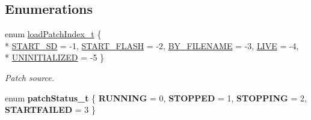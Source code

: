 \subsection*{Enumerations}
\begin{DoxyCompactItemize}
\item 
enum \hyperlink{group__PATCH_ga3bcfa0e2fd6136eb75131fe31d3c0ecf}{load\+Patch\+Index\+\_\+t} \{ \\*
\hyperlink{group__PATCH_gga3bcfa0e2fd6136eb75131fe31d3c0ecfa4ea978b80c692bb277f7219bc4941cac}{S\+T\+A\+R\+T\+\_\+\+SD} = -\/1, 
\hyperlink{group__PATCH_gga3bcfa0e2fd6136eb75131fe31d3c0ecfa14501ea9e7b84bf1917c39939a4fe295}{S\+T\+A\+R\+T\+\_\+\+F\+L\+A\+SH} = -\/2, 
\hyperlink{group__PATCH_gga3bcfa0e2fd6136eb75131fe31d3c0ecfabf80358ff9809b38be4b95d6d157914d}{B\+Y\+\_\+\+F\+I\+L\+E\+N\+A\+ME} = -\/3, 
\hyperlink{group__PATCH_gga3bcfa0e2fd6136eb75131fe31d3c0ecfa5810f7a85a06138a19e6f548273a6927}{L\+I\+VE} = -\/4, 
\\*
\hyperlink{group__PATCH_gga3bcfa0e2fd6136eb75131fe31d3c0ecfaf096820742c38363e9d6c33e7c932780}{U\+N\+I\+N\+I\+T\+I\+A\+L\+I\+Z\+ED} = -\/5
 \}\begin{DoxyCompactList}\small\item\em Patch source. \end{DoxyCompactList}
\item 
enum {\bfseries patch\+Status\+\_\+t} \{ {\bfseries R\+U\+N\+N\+I\+NG} = 0, 
{\bfseries S\+T\+O\+P\+P\+ED} = 1, 
{\bfseries S\+T\+O\+P\+P\+I\+NG} = 2, 
{\bfseries S\+T\+A\+R\+T\+F\+A\+I\+L\+ED} = 3
 \}\hypertarget{group__PATCH_ga4fae02d17665f4d292b175458d7a8ea0}{}\label{group__PATCH_ga4fae02d17665f4d292b175458d7a8ea0}

\end{DoxyCompactItemize}

